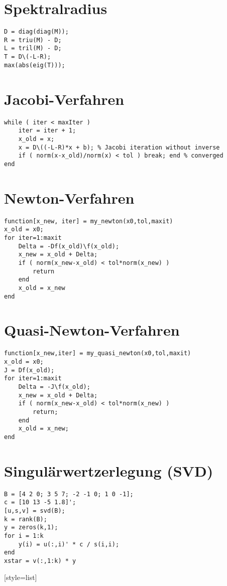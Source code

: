 
\section{Spektralradius}
	\begin{lstlisting}[style=list]
D = diag(diag(M));
R = triu(M) - D;
L = tril(M) - D;
T = D\(-L-R);
max(abs(eig(T)));
	\end{lstlisting}

\section{Jacobi-Verfahren} 
	\begin{lstlisting}[style=list]
while ( iter < maxIter )
	iter = iter + 1;
	x_old = x;
	x = D\((-L-R)*x + b); % Jacobi iteration without inverse
	if ( norm(x-x_old)/norm(x) < tol ) break; end % converged
end
	\end{lstlisting}

\section{Newton-Verfahren} 
	\begin{lstlisting}[style=list]
function[x_new, iter] = my_newton(x0,tol,maxit)
x_old = x0;
for iter=1:maxit
	Delta = -Df(x_old)\f(x_old);
	x_new = x_old + Delta;
	if ( norm(x_new-x_old) < tol*norm(x_new) )
		return
	end
	x_old = x_new
end
	\end{lstlisting}
	
\section{Quasi-Newton-Verfahren} 
	\begin{lstlisting}[style=list]
function[x_new,iter] = my_quasi_newton(x0,tol,maxit)
x_old = x0;
J = Df(x_old);
for iter=1:maxit
	Delta = -J\f(x_old);
	x_new = x_old + Delta;
	if ( norm(x_new-x_old) < tol*norm(x_new) )
		return;
	end
	x_old = x_new;
end
	\end{lstlisting}

\section{Singulärwertzerlegung (SVD)}
	\begin{lstlisting}[style=list]
B = [4 2 0; 3 5 7; -2 -1 0; 1 0 -1];
c = [10 13 -5 1.8]';
[u,s,v] = svd(B);
k = rank(B);
y = zeros(k,1);
for i = 1:k
	y(i) = u(:,i)' * c / s(i,i);
end
xstar = v(:,1:k) * y
	\end{lstlisting}[style=list]


